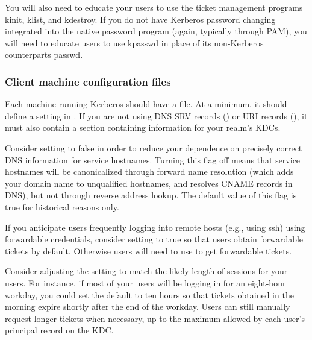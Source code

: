 \documentclass[letterpaper,10pt,english]{sphinxmanual}
\begin{document}
You will also need to educate your users to use the ticket management
programs kinit, klist, and kdestroy.  If you do not have Kerberos
password changing integrated into the native password program (again,
typically through PAM), you will need to educate users to use kpasswd
in place of its non-Kerberos counterparts passwd.


\subsubsection{Client machine configuration files}
\label{\detokenize{admin/install_clients:client-machine-configuration-files}}
Each machine running Kerberos should have a {\hyperref[\detokenize{admin/conf_files/krb5_conf:krb5-conf-5}]{}} file.
At a minimum, it should define a  setting in
{\hyperref[\detokenize{admin/conf_files/krb5_conf:libdefaults}]{}}.  If you are not using DNS SRV records
({\hyperref[\detokenize{admin/realm_config:kdc-hostnames}]{}}) or URI records ({\hyperref[\detokenize{admin/realm_config:kdc-discovery}]{}}), it must
also contain a {\hyperref[\detokenize{admin/conf_files/krb5_conf:realms}]{}} section containing information for your
realm’s KDCs.

Consider setting  to false in order to reduce your dependence
on precisely correct DNS information for service hostnames.  Turning
this flag off means that service hostnames will be canonicalized
through forward name resolution (which adds your domain name to
unqualified hostnames, and resolves CNAME records in DNS), but not
through reverse address lookup.  The default value of this flag is
true for historical reasons only.

If you anticipate users frequently logging into remote hosts
(e.g., using ssh) using forwardable credentials, consider setting
 to true so that users obtain forwardable tickets by
default.  Otherwise users will need to use  to get
forwardable tickets.

Consider adjusting the  setting to match the likely
length of sessions for your users.  For instance, if most of your
users will be logging in for an eight-hour workday, you could set the
default to ten hours so that tickets obtained in the morning expire
shortly after the end of the workday.  Users can still manually
request longer tickets when necessary, up to the maximum allowed by
each user’s principal record on the KDC.
\end{document}
